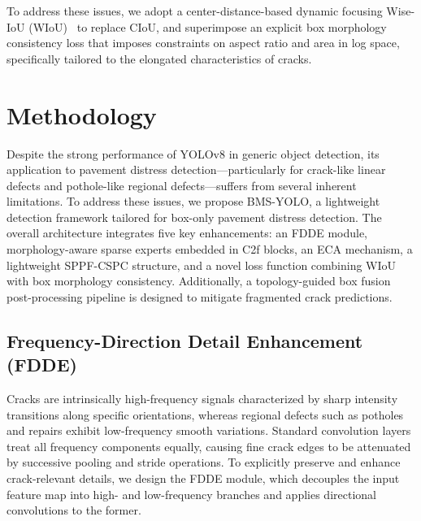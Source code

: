 \documentclass{ieeeaccess}
\begin{document}
{To address these issues, we adopt a center-distance-based dynamic focusing Wise-IoU (WIoU)~\cite{Sui2022} to replace CIoU, and superimpose an explicit box morphology consistency loss that imposes constraints on aspect ratio and area in log space, specifically tailored to the elongated characteristics of cracks.

\section{Methodology}
\label{sec:method}

Despite the strong performance of YOLOv8 in generic object detection, its application to pavement distress detection---particularly for crack-like linear defects and pothole-like regional defects---suffers from several inherent limitations. To address these issues, we propose BMS-YOLO, a lightweight detection framework tailored for box-only pavement distress detection. The overall architecture integrates five key enhancements: an FDDE module, morphology-aware sparse experts embedded in C2f blocks, an ECA mechanism, a lightweight SPPF-CSPC structure, and a novel loss function combining WIoU with box morphology consistency. Additionally, a topology-guided box fusion post-processing pipeline is designed to mitigate fragmented crack predictions.

\subsection{Frequency-Direction Detail Enhancement (FDDE)}

Cracks are intrinsically high-frequency signals characterized by sharp intensity transitions along specific orientations, whereas regional defects such as potholes and repairs exhibit low-frequency smooth variations. Standard convolution layers treat all frequency components equally, causing fine crack edges to be attenuated by successive pooling and stride operations. To explicitly preserve and enhance crack-relevant details, we design the FDDE module, which decouples the input feature map into high- and low-frequency branches and applies directional convolutions to the former.

}
\end{document}

